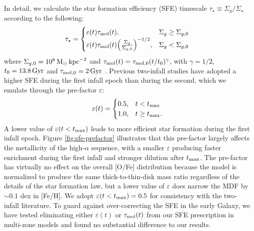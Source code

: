 \documentclass[twocolumn,twocolappendix,linenumbers]{aastex631}
\newcommand{\kpc}{\,{\rm kpc}}
\begin{document}
In detail, we calculate the star formation efficiency (SFE) timescale $\tau_\star\equiv\Sigma_g/\dot\Sigma_\star$ according to the following:
\begin{equation}
    \label{eq:sf-law}
    \tau_\star = 
    \begin{cases}
        \varepsilon(t) \tau_{\rm mol}(t),   & \Sigma_g \ge \Sigma_{g,0} \\
        \varepsilon(t) \tau_{\rm mol}(t) \Big(\frac{\Sigma_g}{\Sigma_{g,0}}\Big)^{-1/2}, & \Sigma_g < \Sigma_{g,0}
    \end{cases}
\end{equation}
where $\Sigma_{g,0} = 10^8\,{\rm M}_\odot\kpc^{-2}$ and $\tau_{\rm mol}(t)=\tau_{\rm mol,0}(t/t_0)^\gamma$, with $\gamma=1/2$, $t_0=13.8\,{\rm Gyr}$ and $\tau_{\rm mol,0}=2\,{\rm Gyr}$ \citet{leroy_star_2008}. Previous two-infall studies \citep[e.g.,][]{nissen_high-precision_2020} have adopted a higher SFE during the first infall epoch than during the second, which we emulate through the pre-factor $\varepsilon$:
\begin{equation}
    \label{eq:sfe-prefactor}
    \varepsilon(t) = 
    \begin{cases}
        0.5, & t < t_{\rm max} \\
        1.0, & t \ge t_{\rm max}.
    \end{cases}
\end{equation}
A lower value of $\varepsilon(t<t_{\rm max})$ leads to more efficient star formation during the first infall epoch. Figure \ref{fig:sfe-prefactor} illustrates that this pre-factor largely affects the metallicity of the high-$\alpha$ sequence, with a smaller $\varepsilon$ producing faster enrichment during the first infall and stronger dilution after $t_{\rm max}$. The pre-factor has virtually no effect on the overall [O/Fe] distribution because the model is normalized to produce the same thick-to-thin-disk mass ratio regardless of the details of the star formation law, but a lower value of $\varepsilon$ does narrow the MDF by $\sim0.1$ dex in [Fe/H]. We adopt $\varepsilon(t<t_{\rm max})=0.5$ for consistency with the two-infall literature. To guard against over-correcting the SFE in the early Galaxy, we have tested eliminating either $\varepsilon(t)$ or $\tau_{\rm mol}(t)$ from our SFE prescription in multi-zone models and found no substantial difference to our results.
\end{document}
